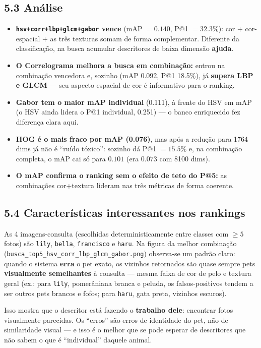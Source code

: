 \documentclass[12pt, a4paper]{article}
\begin{document}
\subsection*{5.3 Análise}
\begin{itemize}
    \item \textbf{\texttt{hsv+corr+lbp+glcm+gabor} vence} (mAP $= 0.140$, P@1 $= 32.3\%$): cor + cor-espacial + as três texturas somam de forma complementar. Diferente da classificação, na busca acumular descritores de baixa dimensão \textbf{ajuda}.
    \item \textbf{O Correlograma melhora a busca em combinação:} entrou na combinação vencedora e, sozinho (mAP 0.092, P@1 18.5\%), já \textbf{supera LBP e GLCM} --- seu aspecto espacial de cor é informativo para o ranking.
    \item \textbf{Gabor tem o maior mAP individual} (0.111), à frente do HSV em mAP (o HSV ainda lidera o P@1 individual, 0.251) --- o banco enriquecido fez diferença clara aqui.
    \item \textbf{HOG é o mais fraco por mAP (0.076)}, mas após a redução para 1764 dims já não é ``ruído tóxico'': sozinho dá P@1 $= 15.5\%$ e, na combinação completa, o mAP cai só para $0.101$ (era $0.073$ com 8100 dims).
    \item \textbf{O mAP confirma o ranking sem o efeito de teto do P@5:} as combinações cor+textura lideram nas três métricas de forma coerente.
\end{itemize}

\subsection*{5.4 Características interessantes nos rankings}
As 4 imagens-consulta (escolhidas deterministicamente entre classes com $\geq 5$ fotos) são \texttt{lily}, \texttt{bella}, \texttt{francisco} e \texttt{haru}. Na figura da melhor combinação (\texttt{busca\_top5\_hsv\_corr\_lbp\_glcm\_gabor.png}) observa-se um padrão claro: quando o sistema \textbf{erra} o pet exato, os vizinhos retornados são quase sempre pets \textbf{visualmente semelhantes} à consulta --- mesma faixa de cor de pelo e textura geral (ex.: para \texttt{lily}, pomerâniana branca e peluda, os falsos-positivos tendem a ser outros pets brancos e fofos; para \texttt{haru}, gata preta, vizinhos escuros).

Isso mostra que o descritor está fazendo o \textbf{trabalho dele}: encontrar fotos visualmente parecidas. Os ``erros'' são erros de identidade do pet, não de similaridade visual --- e isso é o melhor que se pode esperar de descritores que não sabem o que é ``individual'' daquele animal.
\end{document}

